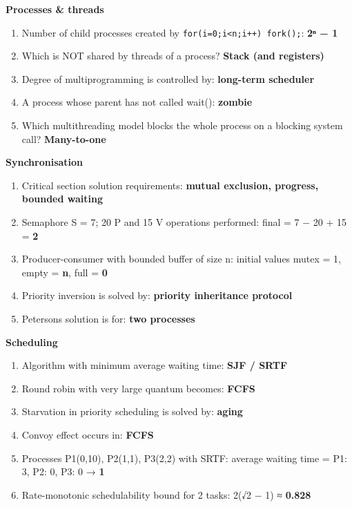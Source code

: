 \textbf{Processes \& threads}

\begin{enumerate}
\def\labelenumi{\arabic{enumi}.}
\setcounter{enumi}{5}
\tightlist
\item
  Number of child processes created by \texttt{for(i=0;i\textless{}n;i++)\ fork();}: \textbf{2ⁿ − 1}
\item
  Which is NOT shared by threads of a process? \textbf{Stack (and registers)}
\item
  Degree of multiprogramming is controlled by: \textbf{long-term scheduler}
\item
  A process whose parent has not called wait(): \textbf{zombie}
\item
  Which multithreading model blocks the whole process on a blocking system call? \textbf{Many-to-one}
\end{enumerate}

\textbf{Synchronisation}

\begin{enumerate}
\def\labelenumi{\arabic{enumi}.}
\setcounter{enumi}{10}
\tightlist
\item
  Critical section solution requirements: \textbf{mutual exclusion, progress, bounded waiting}
\item
  Semaphore S = 7; 20 P and 15 V operations performed: final = 7 − 20 + 15 = \textbf{2}
\item
  Producer-consumer with bounded buffer of size n: initial values mutex = 1, empty = \textbf{n}, full = \textbf{0}
\item
  Priority inversion is solved by: \textbf{priority inheritance protocol}
\item
  Peterson\textquotesingle s solution is for: \textbf{two processes}
\end{enumerate}

\textbf{Scheduling}

\begin{enumerate}
\def\labelenumi{\arabic{enumi}.}
\setcounter{enumi}{15}
\tightlist
\item
  Algorithm with minimum average waiting time: \textbf{SJF / SRTF}
\item
  Round robin with very large quantum becomes: \textbf{FCFS}
\item
  Starvation in priority scheduling is solved by: \textbf{aging}
\item
  Convoy effect occurs in: \textbf{FCFS}
\item
  Processes P1(0,10), P2(1,1), P3(2,2) with SRTF: average waiting time = P1: 3, P2: 0, P3: 0 → \textbf{1}
\item
  Rate-monotonic schedulability bound for 2 tasks: 2(√2 − 1) ≈ \textbf{0.828}
\end{enumerate}

